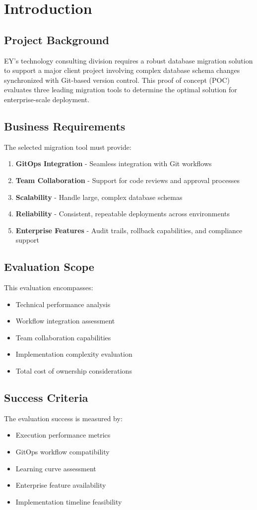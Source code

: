\section{Introduction}

\subsection{Project Background}
EY's technology consulting division requires a robust database migration solution to support a major client project involving complex database schema changes synchronized with Git-based version control. This proof of concept (POC) evaluates three leading migration tools to determine the optimal solution for enterprise-scale deployment.

\subsection{Business Requirements}
The selected migration tool must provide:
\begin{enumerate}
    \item \textbf{GitOps Integration} - Seamless integration with Git workflows
    \item \textbf{Team Collaboration} - Support for code reviews and approval processes
    \item \textbf{Scalability} - Handle large, complex database schemas
    \item \textbf{Reliability} - Consistent, repeatable deployments across environments
    \item \textbf{Enterprise Features} - Audit trails, rollback capabilities, and compliance support
\end{enumerate}

\subsection{Evaluation Scope}
This evaluation encompasses:
\begin{itemize}
    \item Technical performance analysis
    \item Workflow integration assessment
    \item Team collaboration capabilities
    \item Implementation complexity evaluation
    \item Total cost of ownership considerations
\end{itemize}

\subsection{Success Criteria}
The evaluation success is measured by:
\begin{itemize}
    \item Execution performance metrics
    \item GitOps workflow compatibility
    \item Learning curve assessment
    \item Enterprise feature availability
    \item Implementation timeline feasibility
\end{itemize}
